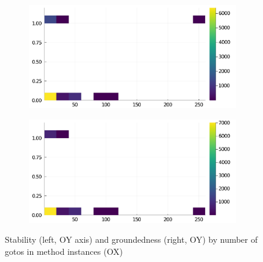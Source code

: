 \begin{figure}[h]
     \begin{subfigure}[b]{0.49\textwidth}
       \includegraphics[width=\textwidth]{figs/all-package-graphs/Knet-gotos-vs-stable.pdf}
     \end{subfigure}
     \begin{subfigure}[b]{0.49\textwidth}
       \includegraphics[width=\textwidth]{figs/all-package-graphs/Knet-gotos-vs-grounded.pdf}
     \end{subfigure}
\caption{Stability (left, OY axis) and groundedness (right, OY) by number of gotos in method instances (OX)}%
%
\label{figs:gotos:Knet}
\end{figure}


